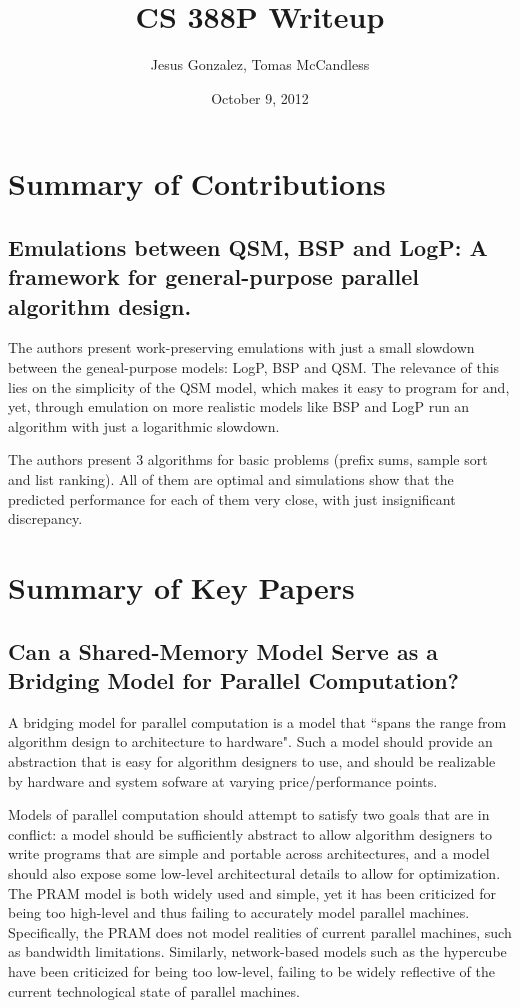 \documentclass[12pt,a4paper]{article}
\author{Jesus Gonzalez, Tomas McCandless}
\title{CS 388P Writeup}
\date{October 9, 2012}
\begin{document}
\maketitle
{}
\doublespace
\newpage


\section{Summary of Contributions}

\subsection{Emulations between QSM, BSP and LogP: A framework for general-purpose parallel algorithm design. \cite{Vlr03}}
The authors present work-preserving emulations with just a small slowdown between the geneal-purpose models: LogP, BSP and QSM. The relevance of this lies on the simplicity of the QSM model, which makes it easy to program for and, yet, through emulation on more realistic models like BSP and LogP run an algorithm with just a logarithmic slowdown.

The authors present 3 algorithms for basic problems (prefix sums, sample sort and list ranking). All of them are optimal and simulations show that the predicted performance for each of them very close, with just insignificant discrepancy.

\section{Summary of Key Papers}
\subsection{Can a Shared-Memory Model Serve as a Bridging Model for Parallel Computation?}
A bridging model for parallel computation is a model that ``spans the range from algorithm design to architecture to hardware". \cite{Gib99}
Such a model should provide an abstraction that is easy for algorithm designers to use, and should be realizable by hardware and system sofware at varying
price/performance points.

Models of parallel computation should attempt to satisfy two goals that are in conflict: a model should be sufficiently abstract to allow algorithm designers to
write programs that are simple and portable across architectures, and a model should also expose some low-level architectural details to allow for optimization. 
The PRAM model is both widely used and simple, yet it has been criticized for being too high-level and thus failing to accurately model parallel machines.
Specifically, the PRAM does not model realities of current parallel machines, such as bandwidth limitations. Similarly, network-based models such as the
hypercube have been criticized for being too low-level, failing to be widely reflective of the current technological state of parallel machines. 
\end{document}
